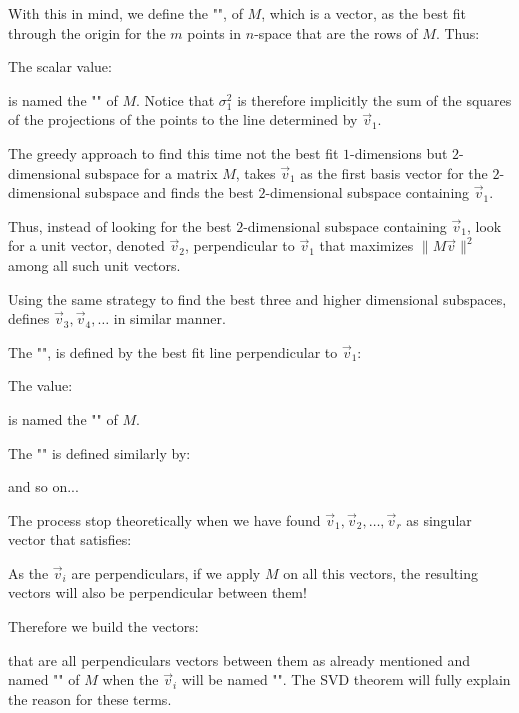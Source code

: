 	With this in mind, we define the "", of $M$, which is a vector, as the best fit through the origin for the $m$ points in $n$-space that are the rows of $M$. Thus:
	
	The scalar value:
	
	is named the "" of $M$. Notice that $\sigma_1^2$ is therefore implicitly the sum of the squares of the projections of the points to the line determined by $\vec{v}_1$.
	
	The greedy approach to find this time not the best fit $1$-dimensions but $2$-dimensional subspace for a matrix $M$, takes $\vec{v}_1$ as the first basis vector for the $2$-dimensional subspace and finds the best $2$-dimensional subspace containing $\vec{v}_1$.

	Thus, instead of looking for the best $2$-dimensional subspace containing $\vec{v}_1$, look for a unit vector, denoted $\vec{v}_2$, perpendicular to $\vec{v}_1$ that maximizes $\|M\vec{v}\|^2$ among all such unit vectors.

	Using the same strategy to find the best three and higher dimensional subspaces, defines $\vec{v}_3,\vec{v}_4,\ldots$ in similar manner.
	
	The "", is defined by the best fit line perpendicular to $\vec{v}_1$:
	
	The value:
	
	is named the "" of $M$. 

	The "" is defined similarly by:
	
	and so on...
	
	The process stop theoretically when we have found $\vec{v}_1,\vec{v}_2,\ldots,\vec{v}_r$ as singular vector that satisfies:
	
	
	As the $\vec{v}_i$ are perpendiculars, if we apply $M$ on all this vectors, the resulting vectors will also be perpendicular between them!  

	Therefore we build the vectors:
	
	that are all perpendiculars vectors between them as already mentioned and named "" of $M$ when the $\vec{v}_i$ will be named "". The SVD theorem will fully explain the reason for these terms.
	
